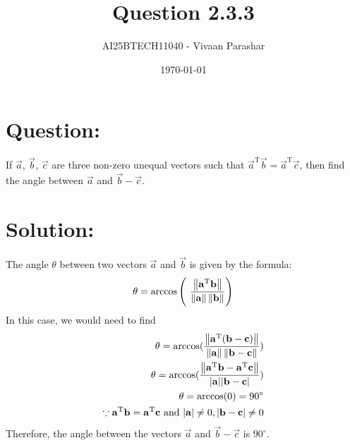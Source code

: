 \documentclass[a4paper, 12pt]{article}
\title{Question 2.3.3}
\author{AI25BTECH11040 - Vivaan Parashar}
\date{\today}
\begin{document}
\maketitle

\section{Question: }
If $\vec{a}$, $\vec{b}$, $\vec{c}$ are three non-zero unequal vectors such that $\vec{a}^{\mathrm{T}}\vec{b} = \vec{a}^{\mathrm{T}}\vec{c}$, then find the angle between $\vec{a}$ and $\vec{b}-\vec{c}$.

\section{Solution: }
The angle $\theta$ between two vectors $\vec{a}$ and $\vec{b}$ is given by the formula:
\begin{align}
    \theta = \arccos \left(\ \frac{\norm{\vec{a}^{\mathrm{T}}\vec{b}}}{\norm{\vec{a}} \norm{\vec{b}}} \right)
\end{align}
In this case, we would need to find
\begin{align}
    \theta = \arccos(\frac{ \left\lVert\mathbf{a}^{\mathrm{T}}(\mathbf{b}-\mathbf{c})\right\rVert}{\left\lVert\mathbf{a}\right\rVert \left\lVert\mathbf{b}-\mathbf{c}\right\rVert})\\
    \theta = \arccos(\frac{\left\lVert\mathbf{a}^{\mathrm{T}}\mathbf{b}-\mathbf{a}^{\mathrm{T}}\mathbf{c}\right\rVert}{|\mathbf{a}||\mathbf{b}-\mathbf{c}|})\\
    \theta = \arccos(0) = 90^\circ\\
    \because \mathbf{a}^{\mathrm{T}}\mathbf{b}=\mathbf{a}^{\mathrm{T}}\mathbf{c} \text{ and } |\mathbf{a}| \ne 0, |\mathbf{b}-\mathbf{c}| \ne 0
\end{align}
Therefore, the angle between the vectors $\vec{a}$ and $\vec{b}-\vec{c}$ is $90^\circ$.
\end{document}
